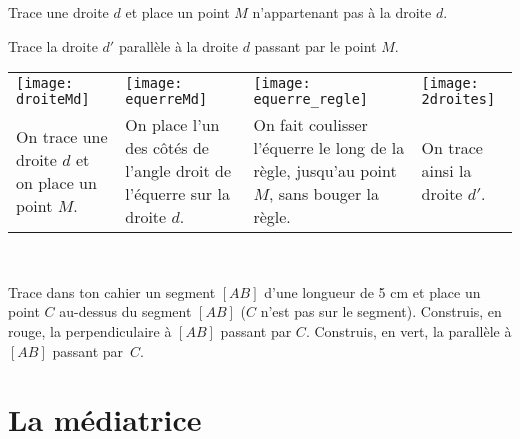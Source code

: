 \begin{methode*1}

\begin{exemple*1}
Trace une droite $d$ et place un point $M$ n'appartenant pas à la droite $d$.

Trace la droite $d'$ parallèle à la droite $d$ passant par le point $M$. \\[0.75em]

\begin{tabularx}{\textwidth}{X|X|X|X}
 \texttt{[image: droiteMd]} &  \texttt{[image: equerreMd]} & \texttt{[image: equerre\_regle]} &  \texttt{[image: 2droites]}\\ 
On trace une droite $d$ et on place un point $M$. & On place l'un des côtés de l'angle droit de l'équerre sur la droite $d$. & On fait coulisser l'équerre le long de la règle, jusqu'au point $M$, sans bouger la règle. & On trace ainsi la droite $d'$.\\
\end{tabularx} \\
 
 \end{exemple*1}

\exercice 
Trace dans ton cahier un segment $[AB]$ d'une longueur de 5 cm et place un point $C$ au-dessus du segment $[AB]$ ($C$ n'est pas sur le segment). Construis, en rouge, la perpendiculaire à $[AB]$ passant par $C$. Construis, en vert, la parallèle à $[AB]$ passant par $C$.

\end{methode*1}

\section{La médiatrice}

